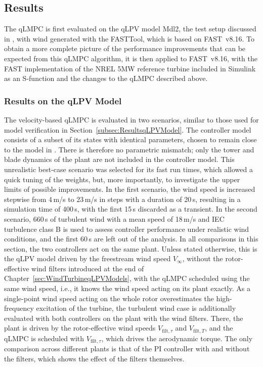 \subsection{Results} \label{quasiLPVMPCResults}
The qLMPC is first evaluated on the qLPV model Mdl2, the test setup discussed in \cite{dittmer2021velocity}, with wind generated with the FASTTool, which is based on FAST~v8.16. To obtain a more complete picture of the performance improvements that can be expected from this qLMPC algorithm, it is then applied to FAST~v8.16, with the FAST implementation of the NREL 5MW reference turbine included in Simulink as an S-function and the changes to the qLMPC described above.

\subsubsection{Results on the qLPV Model}\label{subsubsec:qLMPCMdl2results}

The velocity-based qLMPC is evaluated in two scenarios, similar to those used for model verification in Section~\ref{subsec:ResultsqLPVModel}. The controller model consists of a subset of its states with identical parameters, chosen to remain close to the model in \cite{Bianchi2007}. There is therefore no parametric mismatch; only the tower and blade dynamics of the plant are not included in the controller model. This unrealistic best-case scenario was selected for its fast run times, which allowed a quick tuning of the weights, but, more importantly, to investigate the upper limits of possible improvements. In the first scenario, the wind speed is increased stepwise from 4\,m/s to 23\,m/s in steps with a duration of 20\,s, resulting in a simulation time of 400\,s, with the first 15\,s discarded as a transient. In the second scenario, 660\,s of turbulent wind with a mean speed of 18\,m/s and IEC turbulence class B is used to assess controller performance under realistic wind conditions, and the first 60\,s are left out of the analysis.
%
In all comparisons in this section, the two controllers act on the same plant. Unless stated otherwise, this is the qLPV model driven by the freestream wind speed $V_\infty$, without the rotor-effective wind filters introduced at the end of Chapter~\ref{sec:WindTurbineqLPVModels}, with the qLMPC scheduled using the same wind speed, i.e., it knows the wind speed acting on its plant exactly. As a single-point wind speed acting on the whole rotor overestimates the high-frequency excitation of the turbine, the turbulent wind case is additionally evaluated with both controllers on the plant with the wind filters. There, the plant is driven by the rotor-effective wind speeds $V_{\text{filt},\tau}$ and $V_{\text{filt},T}$, and the qLMPC is scheduled with $V_{\text{filt},\tau}$, which drives the aerodynamic torque. The only comparison across different plants is that of the PI controller with and without the filters, which shows the effect of the filters themselves.

